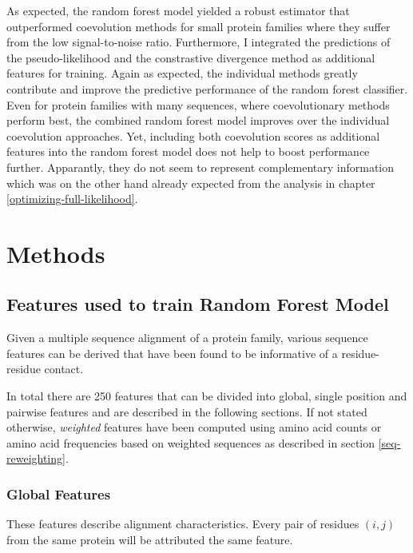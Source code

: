 \documentclass[11pt,a4paper,twoside]{book}
\theoremstyle{definition}
\theoremstyle{definition}
\theoremstyle{remark}
\begin{document}
As expected, the random forest model yielded a robust estimator that
outperformed coevolution methods for small protein families where they
suffer from the low signal-to-noise ratio. Furthermore, I integrated the
predictions of the pseudo-likelihood and the constrastive divergence
method as additional features for training. Again as expected, the
individual methods greatly contribute and improve the predictive
performance of the random forest classifier. Even for protein families
with many sequences, where coevolutionary methods perform best, the
combined random forest model improves over the individual coevolution
approaches. Yet, including both coevolution scores as additional
features into the random forest model does not help to boost performance
further. Apparantly, they do not seem to represent complementary
information which was on the other hand already expected from the
analysis in chapter \ref{optimizing-full-likelihood}.

\newpage

\section{Methods}\label{methods-2}

\subsection{Features used to train Random Forest
Model}\label{seq-features}

Given a multiple sequence alignment of a protein family, various
sequence features can be derived that have been found to be informative
of a residue-residue contact.

In total there are 250 features that can be divided into global, single
position and pairwise features and are described in the following
sections. If not stated otherwise, \emph{weighted} features have been
computed using amino acid counts or amino acid frequencies based on
weighted sequences as described in section \ref{seq-reweighting}.

\subsubsection{Global Features}\label{seq-features-global}

These features describe alignment characteristics. Every pair of
residues \((i,j)\) from the same protein will be attributed the same
feature.
\end{document}

